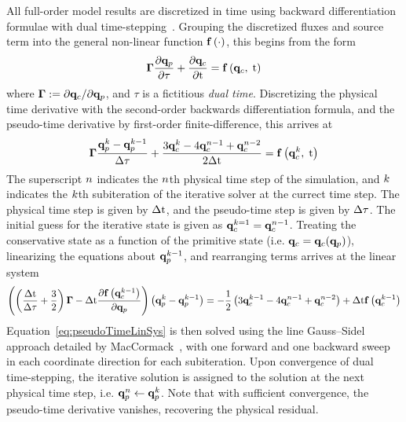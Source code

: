 All full-order model results are discretized in time using backward differentiation formulae with dual time-stepping~\cite{Pandya2003}. Grouping the discretized fluxes and source term into the general non-linear function $\mathbf{f} \left(\cdot\right)$, this begins from the form
%
\begin{equation}
	\boldsymbol{\Gamma} \frac{\partial \mathbf{q}_p}{\partial \tau} + \frac{\partial \mathbf{q}_c}{\partial \text{t}} = \mathbf{f} \left(\mathbf{q}_c, \; \text{t}\right)
\end{equation}
%
where $\boldsymbol{\Gamma} := \partial \mathbf{q}_c / \partial \mathbf{q}_p$, and $\tau$ is a fictitious \textit{dual time}. Discretizing the physical time derivative with the second-order backwards differentiation formula, and the pseudo-time derivative by first-order finite-difference, this arrives at
%
\begin{equation}
	\boldsymbol{\Gamma} \frac{\mathbf{q}_p^{k} - \mathbf{q}_p^{k - 1}}{\Delta \tau} + \frac{3 \mathbf{q}_c^{k} - 4 \mathbf{q}_c^{n - 1} + \mathbf{q}_c^{n - 2}}{2\Delta \text{t}} = \mathbf{f} \left(\mathbf{q}_c^{k}, \; \text{t}\right)
\end{equation}
%
The superscript $n$ indicates the $n$th physical time step of the simulation, and $k$ indicates the $k$th subiteration of the iterative solver at the currect time step. The physical time step is given by $\Delta \text{t}$, and the pseudo-time step is given by $\Delta \tau$. The initial guess for the iterative state is given as $\mathbf{q}_c^{k=1} = \mathbf{q}_c^{n - 1}$. Treating the conservative state as a function of the primitive state (i.e. $\mathbf{q}_c = \mathbf{q}_c(\mathbf{q}_p)$), linearizing the equations about $\mathbf{q}_p^{k - 1}$, and rearranging terms arrives at the linear system
%
\begin{equation}\label{eq:pseudoTimeLinSys}
\left(\left(\frac{\Delta \text{t}}{\Delta \tau} + \frac{3}{2}\right)\boldsymbol{\Gamma} - \Delta \text{t} \frac{\partial \mathbf{f} \left(\mathbf{q}_c^{k - 1}\right)}{\partial \mathbf{q}_p}\right) \left(\mathbf{q}_p^{k} - \mathbf{q}_p^{k - 1}\right) = - \frac{1}{2}\left(3 \mathbf{q}_c^{k-1} - 4 \mathbf{q}_c^{n - 1} + \mathbf{q}_c^{n - 2}\right) + \Delta \text{t} \mathbf{f} \left(\mathbf{q}_c^{k - 1}\right)
\end{equation}
%
Equation~\ref{eq:pseudoTimeLinSys} is then solved using the line Gauss--Sidel approach detailed by MacCormack~\cite{MacCormack1985}, with one forward and one backward sweep in each coordinate direction for each subiteration. Upon convergence of dual time-stepping, the iterative solution is assigned to the solution at the next physical time step, i.e. $\mathbf{q}_p^{n} \leftarrow \mathbf{q}_p^{k}$. Note that with sufficient convergence, the pseudo-time derivative vanishes, recovering the physical residual.

